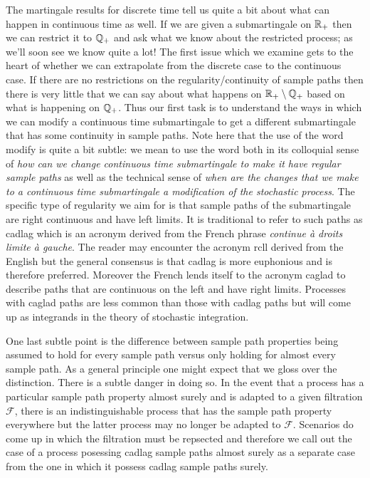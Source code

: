 The martingale results for discrete time tell us quite a
bit about what can happen in continuous time as well.  If we are given
a submartingale on $\mathbb{R}_+$ then we can restrict it to
$\mathbb{Q}_+$ and ask what we know about the restricted process; as
we'll  soon see we know quite a lot!  The first issue which we examine
gets to the heart of whether we can extrapolate from the discrete case
to the continuous case.  If there are no restrictions on the
regularity/continuity of sample paths then there is very little that we can say
about what happens on $\mathbb{R}_+ \setminus \mathbb{Q}_+$ based on what
is happening on $\mathbb{Q}_+$.  Thus our first task is to understand
the ways in which we can modify a continuous time submartingale to get
a different submartingale that has some continuity in sample paths. Note here
that the use of the word modify is quite a bit subtle: we mean to use
the word both in its colloquial sense of \emph{how can we change
  continuous time submartingale to make it have regular sample paths}
as well as the technical sense of \emph{when are the changes that we
  make to a continuous time submartingale a modification of the
  stochastic process}.   The
specific type of regularity we aim for is that sample paths of the
submartingale are right continuous and have left limits.  It is
traditional to refer to such paths as cadlag which is an acronym
derived from the French phrase \emph{continue \`{a} droits limite
  \`{a} gauche}.  The reader may encounter the acronym rcll derived from
the English but the general consensus is that cadlag is more euphonious
and is therefore preferred.  Moreover the French lends itself to the
acronym caglad to describe paths that are continuous on the left and
have right limits.  Processes with caglad paths are less common than
those with cadlag paths but will come up as integrands in the theory
of stochastic integration.

One last subtle point is the difference between sample path properties
being assumed to hold for every sample path versus only holding for
almost every sample path.   As a general principle one might expect
that we gloss over the distinction.  There is a subtle danger in doing
so.  In the event that a process has a particular sample path property
almost surely and is adapted to a given filtration $\mathcal{F}$,
there is an indistinguishable process that has the sample path
property everywhere but the latter process may no longer be adapted to
$\mathcal{F}$.  Scenarios do come up in which the filtration must be
repsected and therefore we call out the case of a process posessing
cadlag sample paths almost surely as a separate case from the one in
which it possess cadlag sample paths surely.

